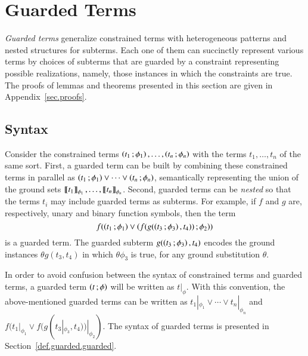 
\section{Guarded Terms}
\label{sec.guarded}

\emph{Guarded terms} generalize constrained terms with heterogeneous
patterns and nested structures for subterms.  Each one of them can
succinctly represent various terms by choices of subterms that are
guarded by a constraint representing possible realizations, namely,
those instances in which the constraints are true. The proofs of
lemmas and theorems presented in this section are given in
Appendix~\ref{sec.proofs}.


\subsection{Syntax}
Consider the constrained terms
$\left( t_1 \,; \phi_1 \right),\ldots,\left( t_n \,; \phi_n \right)$ with the terms
$t_1,\ldots,t_n$ of the same sort. First, a guarded term can be built
by combining these constrained terms in parallel as
$\left( t_1 \,; \phi_1 \right) \lor \cdots \lor \left( t_n \,; \phi_n \right)$, semantically
representing the union of the ground sets
$\left\llbracket t_1 \right\rrbracket_{\phi_1},\ldots,\left\llbracket t_n \right\rrbracket_{\phi_n}$.  Second, guarded terms
can be \emph{nested} so that the terms $t_i$ may include guarded terms
as subterms. For example, if $f$ and $g$ are, respectively, unary and
binary function symbols, then the term
\[f(\left( t_1 \,; \phi_1 \right) \lor \left( f(g(\left( t_3 \,; \phi_3 \right), t_4)) \,; \phi_2 \right))\]
is a guarded term.  The guarded subterm $g(\left( t_3 \,; \phi_3 \right), t_4)$
encodes the ground instances $\theta g(t_3,t_4)$ in which
$\theta\phi_3$ is true, for any ground substitution $\theta$.

In order to avoid confusion between the syntax of constrained terms
and guarded terms, a guarded term $\left( t \,; \phi \right)$ will be written as
$t |_\phi$. With this convention, the above-mentioned guarded terms
can be written as $t_1 |_{\phi_1} \lor \cdots \lor t_n |_{\phi_n}$ and
$f(t_1 |_{\phi_1} \lor f(g(t_3 |_{\phi_3}, t_4)) |_{\phi_2})$.
%
The syntax of guarded terms is presented in
Section~\ref{def.guarded.guarded}.

